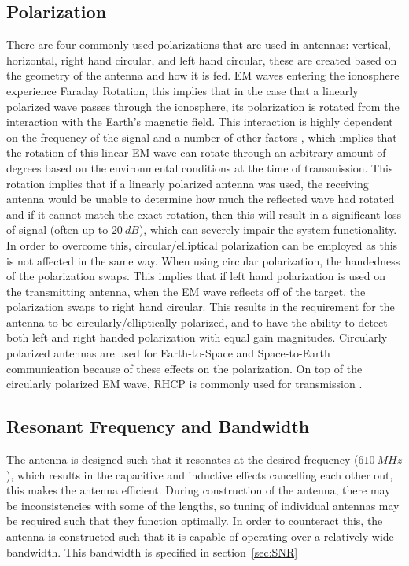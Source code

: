 \documentclass[11pt]{witseiepaper}
\begin{document}
\begin{bibunit}[witseie]
\subsection{Polarization} \label{sec:Polarization}
There are four commonly used polarizations that are used in antennas: vertical, horizontal, right hand circular, and left hand circular, these are created based on the geometry of the antenna and how it is fed.
EM waves entering the ionosphere experience Faraday Rotation, this implies that in the case that a linearly polarized wave passes through the ionosphere, its polarization is rotated from the interaction with the Earth's magnetic field. This interaction is highly dependent on the frequency of the signal and a number of other factors \cite[p.~24]{faradayRotationSlides}, which implies that the rotation of this linear EM wave can rotate through an arbitrary amount of degrees based on the environmental conditions at the time of transmission. This rotation implies that if a linearly polarized antenna was used, the receiving antenna would be unable to determine how much the reflected wave had rotated and if it cannot match the exact rotation, then this will result in a significant loss of signal (often up to $20~dB$), which can severely impair the system functionality.
In order to overcome this, circular/elliptical polarization can be employed as this is not affected in the same way.
When using circular polarization, the handedness of the polarization swaps. This implies that if left hand polarization is used on the transmitting antenna, when the EM wave reflects off of the target, the polarization swaps to right hand circular.
This results in the requirement for the antenna to be circularly/elliptically polarized, and to have the ability to detect both left and right handed polarization with equal gain magnitudes.
Circularly polarized antennas are used for Earth-to-Space and Space-to-Earth communication because of these effects on the polarization. On top of the circularly polarized EM wave, RHCP is commonly used for transmission \cite[p.~31]{crossedDipoleDesign}.

\subsection{Resonant Frequency and Bandwidth} \label{sec:ResonantFrequencyandBandwidth}
The antenna is designed such that it resonates at the desired frequency ($610~MHz$), which results in the capacitive and inductive effects cancelling each other out, this makes the antenna efficient. During construction of the antenna, there may be inconsistencies with some of the lengths, so tuning of individual antennas may be required such that they function optimally. In order to counteract this, the antenna is constructed such that it is capable of operating over a relatively wide bandwidth. This bandwidth is specified in section~\ref{sec:SNR}


\end{bibunit}
\end{document}
